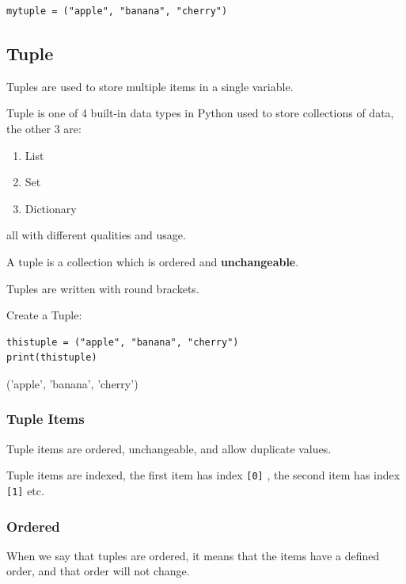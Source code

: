 \documentclass[12pt,a4paper]{article}
\newcommand{\code}[1]{%
	\colorbox{backcolour}{\lstinline{#1}}%
}
\begin{document}
\begin{lstlisting}
mytuple = ("apple", "banana", "cherry")
\end{lstlisting}

\subsection{Tuple}

Tuples are used to store multiple items in a single variable.

Tuple is one of 4 built-in data types in Python used to store collections of
data, the other 3 are:
\begin{multicols}{2}
	\begin{enumerate}
\item List
\item Set
\item Dictionary
	\end{enumerate}
\end{multicols}
all with different qualities and usage.

A tuple is a collection which is ordered and \textbf{unchangeable}.

Tuples are written with round brackets.

\begin{ebox}
Create a Tuple:
	\begin{lstlisting}
thistuple = ("apple", "banana", "cherry")
print(thistuple)
	\end{lstlisting}
\tcblower
	\begin{vercode}
('apple', 'banana', 'cherry')
	\end{vercode}
\end{ebox}

\subsubsection{Tuple Items}

Tuple items are ordered, unchangeable, and allow duplicate values.

Tuple items are indexed, the first item has index \code{[0]}, the second item
has index \code{[1]} etc.
\subsubsection{Ordered}

When we say that tuples are ordered, it means that the items have a defined
order, and that order will not change.
\end{document}
